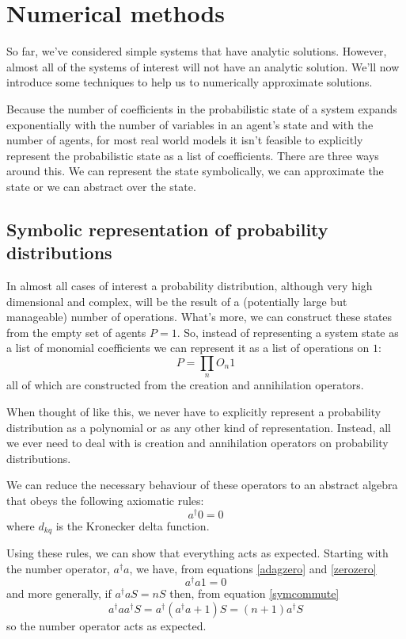 \documentclass[letterpaper,twocolumn,10pt]{article}
\begin{document}
\section{Numerical methods}

So far, we've considered simple systems that have analytic solutions. However, almost all of the systems of interest will not have an analytic solution. We'll now introduce some techniques to help us to numerically approximate solutions.

Because the number of coefficients in the probabilistic state of a system expands exponentially with the number of variables in an agent's state and with the number of agents, for most real world models it isn't feasible to explicitly represent the probabilistic state as a list of coefficients. There are three ways around this. We can represent the state symbolically, we can approximate the state or we can abstract over the state.

\subsection{Symbolic representation of probability distributions}

In almost all cases of interest a probability distribution, although very high dimensional and complex, will be the result of a (potentially large but manageable) number of operations. What's more, we can construct these states from the empty set of agents $P=1$. So, instead of representing a system state as a list of monomial coefficients we can represent it as a list of operations on $1$:
\[
P = \prod_n O_n1
\]
all of which are constructed from the creation and annihilation operators.

When thought of like this, we never have to explicitly represent a probability distribution as a polynomial or as any other kind of representation. Instead, all we ever need to deal with is creation and annihilation operators on probability distributions.

We can reduce the necessary behaviour of these operators to an abstract algebra that obeys the following axiomatic rules:
\begin{equation}
a^\dag 0 = 0
\label{zerozero}
\end{equation}
where $d_{kq}$ is the Kronecker delta function.

Using these rules, we can show that everything acts as expected. Starting with the number operator, $a^\dag a$, we have, from equations \ref{adagzero} and \ref{zerozero}
\[
a^\dag a 1 = 0
\]
and more generally, if $a^\dag a S = nS$ then, from equation \ref{symcommute}
\[
a^\dag a a^\dag S = a^\dag(a^\dag a +1)S = (n+1)a^\dag S
\]
so the number operator acts as expected.
\end{document}
